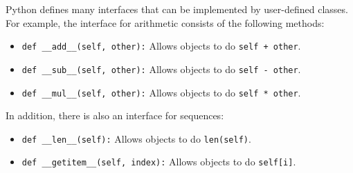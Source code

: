 Python defines many interfaces that can be implemented by user-defined classes.
For example, the interface for arithmetic consists of the following methods:

\begin{itemize}
\item
\texttt{def \_\_add\_\_(self, other):} Allows objects to do \texttt{self +
other}.
\item
\texttt{def \_\_sub\_\_(self, other):} Allows objects to do \texttt{self -
other}.
\item
\texttt{def \_\_mul\_\_(self, other):} Allows objects to do \texttt{self *
other}.
\end{itemize}

In addition, there is also an interface for sequences:

\begin{itemize}
\item
\texttt{def \_\_len\_\_(self):} Allows objects to do \texttt{len(self)}.
\item
\texttt{def \_\_getitem\_\_(self, index):} Allows objects to do
\texttt{self[i]}.
\end{itemize}

